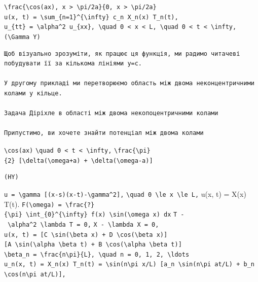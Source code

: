 \documentclass[
  ukrainian,
]{article}
\begin{document}
\texttt{\textbackslash{}frac\{\textbackslash{}cos(ax),\ \textbar{}x\textbar{}\ \textgreater{}\ \textbackslash{}pi/2a\}\{0,\ \textbar{}x\textbar{}\ \textgreater{}\ \textbackslash{}pi/2a\}}
\texttt{u(x,\ t)\ =\ \textbackslash{}sum\_\{n=1\}\^{}\{\textbackslash{}infty\}\ c\_n\ X\_n(x)\ T\_n(t),}
\texttt{u\_\{tt\}\ =\ \textbackslash{}alpha\^{}2\ u\_\{xx\},\ \textbackslash{}quad\ 0\ \textless{}\ x\ \textless{}\ L,\ \textbackslash{}quad\ 0\ \textless{}\ t\ \textless{}\ \textbackslash{}infty,}
\texttt{(\textbackslash{}Gamma\ Y)}

\begin{verbatim}
Щоб візуально зрозуміти, як працює ця функція, ми радимо читачеві побудувати її за кількома лініями y=c.

У другому прикладі ми перетворюємо область між двома неконцентричними колами у кільце.

Задача Діріхле в області між двома некопоцентричними колами

Припустимо, ви хочете знайти потенціал між двома колами
\end{verbatim}

\texttt{\textbackslash{}cos(ax)}
\texttt{\textbackslash{}quad\ 0\ \textless{}\ t\ \textless{}\ \textbackslash{}infty,}
\texttt{\textbackslash{}frac\{\textbackslash{}pi\}\{2\}\ {[}\textbackslash{}delta(\textbackslash{}omega+a)\ +\ \textbackslash{}delta(\textbackslash{}omega-a){]}}

\begin{verbatim}
(HY)
\end{verbatim}

\texttt{u\ =\ \textbackslash{}gamma\ {[}(x-s)(x-t)-\textbackslash{}gamma\^{}2{]},}
\texttt{\textbackslash{}quad\ 0\ \textbackslash{}le\ x\ \textbackslash{}le\ L,}
u(x, t) = X(x) T(t).
\texttt{F(\textbackslash{}omega)\ =\ \textbackslash{}frac\{?\}\{\textbackslash{}pi\}\ \textbackslash{}int\_\{0\}\^{}\{\textbackslash{}infty\}\ f(x)\ \textbackslash{}sin(\textbackslash{}omega\ x)\ dx}
\texttt{T\textquotesingle{}\textquotesingle{}\ -\ \textbackslash{}alpha\^{}2\ \textbackslash{}lambda\ T\ =\ 0,}
\texttt{X\textquotesingle{}\textquotesingle{}\ -\ \textbackslash{}lambda\ X\ =\ 0,}
\texttt{u(x,\ t)\ =\ {[}C\ \textbackslash{}sin(\textbackslash{}beta\ x)\ +\ D\ \textbackslash{}cos(\textbackslash{}beta\ x){]}{[}A\ \textbackslash{}sin(\textbackslash{}alpha\ \textbackslash{}beta\ t)\ +\ B\ \textbackslash{}cos(\textbackslash{}alpha\ \textbackslash{}beta\ t){]}}
\texttt{\textbackslash{}beta\_n\ =\ \textbackslash{}frac\{n\textbackslash{}pi\}\{L\},\ \textbackslash{}quad\ n\ =\ 0,\ 1,\ 2,\ \textbackslash{}ldots}
\texttt{u\_n(x,\ t)\ =\ X\_n(x)\ T\_n(t)\ =\ \textbackslash{}sin(n\textbackslash{}pi\ x/L)\ {[}a\_n\ \textbackslash{}sin(n\textbackslash{}pi\ at/L)\ +\ b\_n\ \textbackslash{}cos(n\textbackslash{}pi\ at/L){]},}
\end{document}
